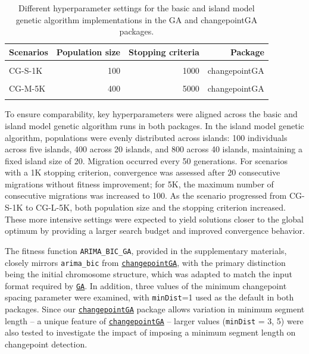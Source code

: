 \begin{table}[!h]
\centering
\caption{\label{tab:ScenarioTable}Different hyperparameter settings for the basic and island model genetic algorithm implementations in the GA and changepointGA packages.}
\centering
\begin{tabular}[t]{lrrr}
\toprule
Scenarios & Population size & Stopping criteria & Package\\
\midrule
\cellcolor{gray!10}{GA-S-1K} & \cellcolor{gray!10}{100} & \cellcolor{gray!10}{1000} & \cellcolor{gray!10}{GA}\\
CG-S-1K & 100 & 1000 & changepointGA\\
\cellcolor{gray!10}{CG-S-5K} & \cellcolor{gray!10}{100} & \cellcolor{gray!10}{5000} & \cellcolor{gray!10}{changepointGA}\\
CG-M-5K & 400 & 5000 & changepointGA\\
\cellcolor{gray!10}{CG-L-5K} & \cellcolor{gray!10}{800} & \cellcolor{gray!10}{5000} & \cellcolor{gray!10}{changepointGA}\\
\bottomrule
\end{tabular}
\end{table}

To ensure comparability, key hyperparameters were aligned across the basic and island model genetic algorithm runs in both packages. In the island model genetic algorithm, populations were evenly distributed across islands: 100 individuals across five islands, 400 across 20 islands, and 800 across 40 islands, maintaining a fixed island size of 20. Migration occurred every 50 generations. For scenarios with a 1K stopping criterion, convergence was assessed after 20 consecutive migrations without fitness improvement; for 5K, the maximum number of consecutive migrations was increased to 100. As the scenario progressed from CG-S-1K to CG-L-5K, both population size and the stopping criterion increased. These more intensive settings were expected to yield solutions closer to the global optimum by providing a larger search budget and improved convergence behavior.

The fitness function \texttt{ARIMA\_BIC\_GA}, provided in the supplementary materials, closely mirrors \texttt{arima\_bic} from \href{https://CRAN.R-project.org/package=changepointGA}{\texttt{changepointGA}}, with the primary distinction being the initial chromosome structure, which was adapted to match the input format required by \href{https://CRAN.R-project.org/package=GA}{\texttt{GA}}. In addition, three values of the minimum changepoint spacing parameter were examined, with \texttt{minDist}=1 used as the default in both packages. Since our \href{https://CRAN.R-project.org/package=changepointGA}{\texttt{changepointGA}} package allows variation in minimum segment length -- a unique feature of \href{https://CRAN.R-project.org/package=changepointGA}{\texttt{changepointGA}} -- larger values (\texttt{minDist} = 3, 5) were also tested to investigate the impact of imposing a minimum segment length on changepoint detection.

